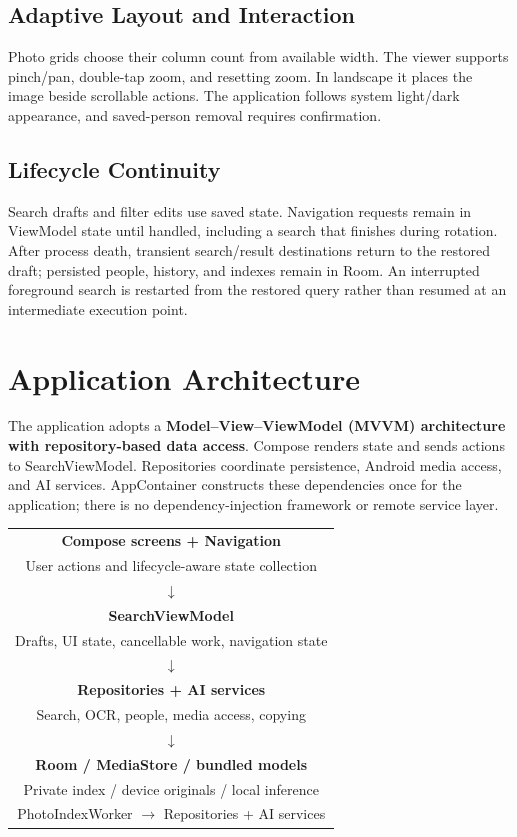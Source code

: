 \documentclass[11pt,a4paper]{article}
\newcommand{\reportsection}[1]{\section{#1}}
\begin{document}
\subsection{Adaptive Layout and Interaction}

Photo grids choose their column count from available width. The viewer supports pinch/pan, double-tap zoom, and resetting zoom. In landscape it places the image beside scrollable actions. The application follows system light/dark appearance, and saved-person removal requires confirmation.

\subsection{Lifecycle Continuity}

Search drafts and filter edits use saved state. Navigation requests remain in ViewModel state until handled, including a search that finishes during rotation. After process death, transient search/result destinations return to the restored draft; persisted people, history, and indexes remain in Room. An interrupted foreground search is restarted from the restored query rather than resumed at an intermediate execution point.


\reportsection{Application Architecture}

The application adopts a \textbf{Model--View--ViewModel (MVVM) architecture with repository-based data access}. Compose renders state and sends actions to SearchViewModel. Repositories coordinate persistence, Android media access, and AI services. AppContainer constructs these dependencies once for the application; there is no dependency-injection framework or remote service layer.


\begin{center}
\begin{tabular}{c}
\textbf{Compose screens + Navigation} \\
User actions and lifecycle-aware state collection \\
$\downarrow$ \\
\textbf{SearchViewModel} \\
Drafts, UI state, cancellable work, navigation state \\
$\downarrow$ \\
\textbf{Repositories + AI services} \\
Search, OCR, people, media access, copying \\
$\downarrow$ \\
\textbf{Room / MediaStore / bundled models} \\
Private index / device originals / local inference \\[5pt]
PhotoIndexWorker $\rightarrow$ Repositories + AI services
\end{tabular}
\end{center}
\end{document}
